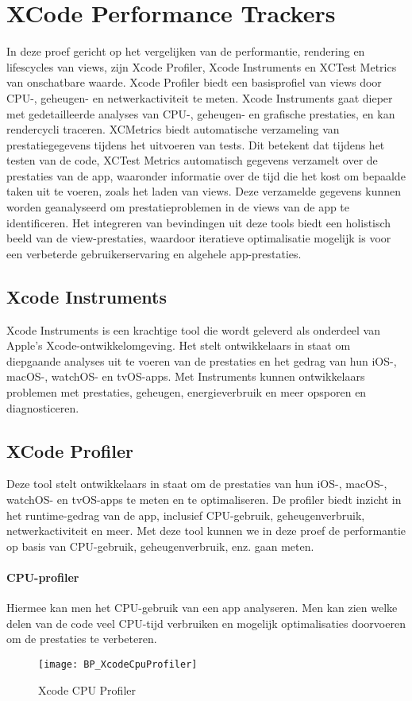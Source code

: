 \section{XCode Performance Trackers}

In deze proef gericht op het vergelijken van de performantie, rendering en lifescycles van views, zijn Xcode Profiler, Xcode Instruments en XCTest Metrics van onschatbare waarde. Xcode Profiler biedt een basisprofiel van views door CPU-, geheugen- en netwerkactiviteit te meten. Xcode Instruments gaat dieper met gedetailleerde analyses van CPU-, geheugen- en grafische prestaties, en kan rendercycli traceren. XCMetrics biedt automatische verzameling van prestatiegegevens tijdens het uitvoeren van tests. Dit betekent dat tijdens het testen van de code, XCTest Metrics automatisch gegevens verzamelt over de prestaties van de app, waaronder informatie over de tijd die het kost om bepaalde taken uit te voeren, zoals het laden van views. Deze verzamelde gegevens kunnen worden geanalyseerd om prestatieproblemen in de views van de app te identificeren. Het integreren van bevindingen uit deze tools biedt een holistisch beeld van de view-prestaties, waardoor iteratieve optimalisatie mogelijk is voor een verbeterde gebruikerservaring en algehele app-prestaties.



\subsection{Xcode Instruments}
Xcode Instruments is een krachtige tool die wordt geleverd als onderdeel van Apple's Xcode-ontwikkelomgeving. Het stelt ontwikkelaars in staat om diepgaande analyses uit te voeren van de prestaties en het gedrag van hun iOS-, macOS-, watchOS- en tvOS-apps. Met Instruments kunnen ontwikkelaars problemen met prestaties, geheugen, energieverbruik en meer opsporen en diagnosticeren. 

\subsection{XCode Profiler}
Deze tool stelt ontwikkelaars in staat om de prestaties van hun iOS-, macOS-, watchOS- en tvOS-apps te meten en te optimaliseren. De profiler biedt inzicht in het runtime-gedrag van de app, inclusief CPU-gebruik, geheugenverbruik, netwerkactiviteit en meer. Met deze tool kunnen we in deze proef de performantie op basis van CPU-gebruik, geheugenverbruik, enz. gaan meten. 
\paragraph{CPU-profiler}
Hiermee kan men het CPU-gebruik van een app analyseren. Men kan zien welke delen van de code veel CPU-tijd verbruiken en mogelijk optimalisaties doorvoeren om de prestaties te verbeteren.
\begin{figure}[H]
    \centering
    \texttt{[image: BP\_XcodeCpuProfiler]} 
    \caption{Xcode CPU Profiler}
    \label{fig:cpuProfiler}
\end{figure}
